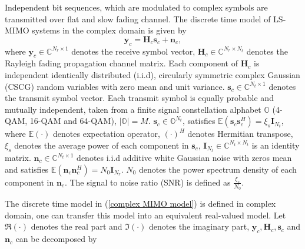 \documentclass[10pt, draftclsnofoot, onecolumn]{IEEEtran}
\begin{document}
Independent bit sequences, which are modulated to complex symbols are transmitted over flat and slow fading channel. The discrete time model of LS-MIMO systems in the complex domain is given by 
\begin{equation}
\mathbf{y}_{c}=\mathbf{H}_{c}\mathbf{s}_{c}+\mathbf{n}_{c},
\label{complex MIMO model}
\end{equation}
where $\mathbf{y}_{c}\in \mathbb{C}^{N_{r}\times 1}$ denotes the receive symbol vector, $\mathbf{H}_{c}\in \mathbb{C}^{N_{r}\times N_{t}}$ denotes the Rayleigh fading propagation channel matrix. Each component of $\mathbf{H}_{c}$ is independent identically distributed (i.i.d), circularly symmetric complex Gaussian (CSCG) random variables with zero mean and unit variance. $\mathbf{s}_{c}\in \mathbb{C}^{N_{t}\times 1}$ denotes the transmit symbol vector. Each transmit symbol is equally probable and mutually independent, taken from a finite signal constellation alphabet $\mathbb{O}$ (4-QAM, 16-QAM and 64-QAM), $|\mathbb{O}|=M$. $\mathbf{s}_{c}\in \mathbb{O}^{N_{t}}$, satisfies $\mathbb{E}(\mathbf{s}_{c}\mathbf{s}^{H}_{c})=\xi_{s}\mathbf{I}_{N_{t}}$, where $\mathbb{E}(\cdot)$ denotes expectation operator, $(\cdot)^{H}$ denotes Hermitian transpose, $\xi_{s}$ denotes the average power of each component in $\mathbf{s}_{c}$, $\mathbf{I}_{N_{t}}\in \mathbb{C}^{N_{t}\times N_{t}}$ is an identity matrix. $\mathbf{n}_{c}\in \mathbb{C}^{N_{t}\times 1}$ denotes i.i.d additive white Gaussian noise with zeros mean and satisfies $\mathbb{E}(\mathbf{n}_{c}\mathbf{n}^{H}_{c})=N_{0}\mathbf{I}_{N_{r}}$. $N_{0}$ denotes the power spectrum density of each component in $\mathbf{n}_{c}$. The signal to noise ratio (SNR) is defined as $\frac{\xi_{s}}{N_{0}}$.

The discrete time model in (\ref{complex MIMO model}) is defined in complex domain, one can transfer this model into an equivalent real-valued model. Let $\Re(\cdot)$ denotes the real part and $\Im(\cdot)$ denotes the imaginary part, $\mathbf{y}_{c}, \mathbf{H}_{c}, \mathbf{s}_{c}$ and $\mathbf{n}_{c}$ can be decomposed by 

\newcommand{\mysmallarraydecl}{\renewcommand{%
\IEEEeqnarraymathstyle}{\scriptscriptstyle}%
\renewcommand{\IEEEeqnarraytextstyle}{\scriptsize}%
\renewcommand{\baselinestretch}{1.1}%
\settowidth{\normalbaselineskip}{\scriptsize
\hspace{\baselinestretch\baselineskip}}%
\setlength{\baselineskip}{\normalbaselineskip}%
\setlength{\jot}{0.25\normalbaselineskip}%
\setlength{\arraycolsep}{2pt}}
\end{document}
